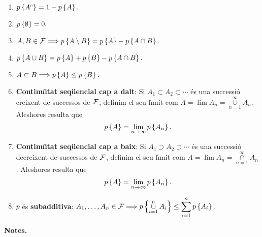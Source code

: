 \begin{enumerate}

\item $p\left\{A^c\right\} = 1 - p\left\{A\right\}.$

\item $p\left\{\emptyset\right\} = 0.$

\item $A, B \in {\cal F} \Longrightarrow p\left\{A \setminus B\right\} = p\left\{A\right\} - 
p\left\{A \cap B\right\}.
$

\item $p\left\{A \cup B\right\} = p\left\{A\right\}+ p\left\{B\right\} - p\left\{A \cap B\right\}.$

\item $A \subset B \Longrightarrow p\left\{A\right\} \leq p\left\{B\right\}.$

\item {\bf Continu\"{\i}tat seq\"uencial cap a
dalt}:
 Si $A_1 \subset A_2 \subset \cdots$ \'es una successi\'o creixent de
successos de ${\cal F}$, definim el seu l\'{\i}mit com $A = \lim A_n = \mathop{
\cup}\limits_{n=1}^\infty A_n$. Aleshores resulta que
$$p\left\{A\right\} = \lim_{n\to\infty} p\left\{A_n\right\}.$$

\item {\bf Continu\"{\i}tat seq\"uencial cap a baix}: Si 
$A_1 \supset A_2
\supset \cdots$ \'es una successi\'o decreixent de successos de ${\cal F}$,
definim el seu l\'{\i}mit com $A = \lim A_n = \mathop{ \cap}\limits_{n=1}^\infty
A_n$. Aleshores resulta que $$p\left\{A\right\} = \lim_{n\to\infty} p\left\{A_n\right\}.$$

\item $p$ \'es {\bf subadditiva}: $\displaystyle A_1, \ldots ,A_n \in {\cal F}
\Longrightarrow p\left\{\mathop{\cup}\limits_{i=1}^n A_i\right\}
 \leq \sum\limits_{i=1}^n p\left\{A_i\right\}.$

\end{enumerate}

{\bf Notes.}

